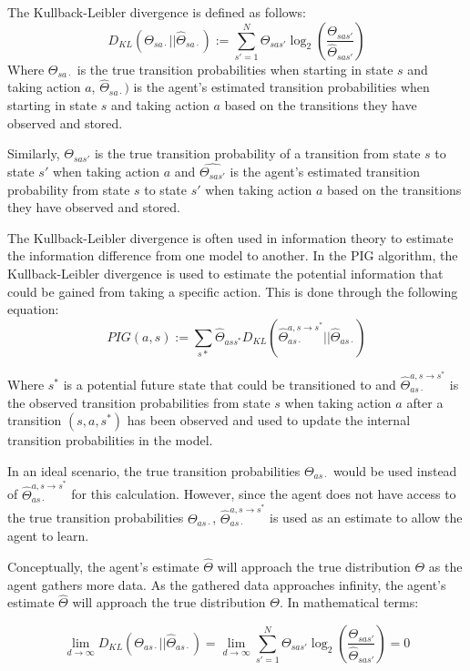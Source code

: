 \documentclass[12pt]{thesis}
\begin{document}
The Kullback-Leibler divergence is defined as follows:
\[D_{KL} (\Theta_{sa\cdot} || \hat{\Theta}_{sa\cdot}) := \sum_{s' = 1}^{ N} \Theta_{sas'} \log_{2}(\frac{\Theta_{sas'}}{\hat{\Theta}_{sas'}})   \]
Where $\Theta_{sa\cdot}$ is the true transition probabilities when starting in state $s$ and taking action $a$, $\hat{\Theta}_{sa\cdot})$ is the agent's estimated transition probabilities when starting in state $s$ and taking action $a$  based on the transitions they have observed and stored.

Similarly, $\Theta_{sas'}$ is the true transition probability of a transition from state $s$ to state $s'$ when taking action $a$ and $\hat{\Theta_{sas'}}$ is the agent's estimated transition probability from state $s$ to state $s'$ when taking action $a$ based on the transitions they have observed and stored.

The Kullback-Leibler divergence is often used in information theory to estimate the information difference from one model to another. In the PIG algorithm, the Kullback-Leibler divergence is used to estimate the potential information that could be gained from taking a specific action.
This is done through the following equation:
\[ PIG(a,s) := \sum_{s*} \hat{\Theta}_{ass^{*}}D_{KL}(\hat{\Theta}_{as\cdot}^{a,s \rightarrow s^{*}} || \hat{\Theta}_{as\cdot}) \]

Where $s^{*}$ is a potential future state that could be transitioned to and $\hat{\Theta}_{as\cdot}^{a,s \rightarrow s^{*}}$ is the observed transition probabilities from state $s$ when taking action $a$ after a transition $(s,a,s^{*})$ has been observed and used to update the internal transition probabilities in the model.

In an ideal scenario, the true transition probabilities $\Theta_{as\cdot}$ would be used instead of $\hat{\Theta}_{as\cdot}^{a,s \rightarrow s^{*}}$ for this calculation. However, since the agent does not have access to the true transition probabilities $\Theta_{as\cdot}$, $\hat{\Theta}_{as\cdot}^{a,s \rightarrow s^{*}}$ is used as an estimate to allow the agent to learn.

Conceptually, the agent's estimate $\hat{\Theta}$ will approach the true distribution $\Theta$ as the agent gathers more data. As the gathered data approaches infinity, the agent's estimate $\hat{\Theta}$ will approach the true distribution $\Theta$. In mathematical terms:

\[ \lim_{d \rightarrow \infty} D_{KL}( \Theta_{as\cdot} || \hat{\Theta}_{as\cdot}) = \lim_{d \rightarrow \infty} \sum_{s' = 1}^{ N} \Theta_{sas'} \log_{2}(\frac{\Theta_{sas'}}{\hat{\Theta}_{sas'}}) = 0\]
\end{document}
